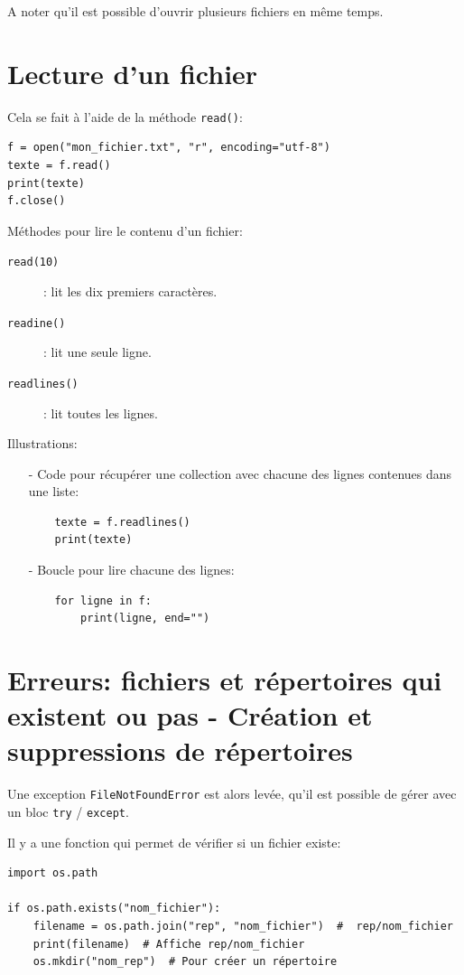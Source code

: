 \documentclass[a4paper,12pt]{book}
\begin{document}
A noter qu'il est possible d'ouvrir plusieurs fichiers en même temps.
\medskip

\section{Lecture d'un fichier}
Cela se fait à l'aide de la méthode \texttt{read()}:
\begin{lstlisting}
f = open("mon_fichier.txt", "r", encoding="utf-8")
texte = f.read()
print(texte)
f.close()
\end{lstlisting}
\medskip

Méthodes pour lire le contenu d'un fichier:
\begin{description}
    \item[\texttt{read(10)}]: lit les dix premiers caractères.
    \item[\texttt{readine()}]: lit une seule ligne.
    \item[\texttt{readlines()}]: lit toutes les lignes.
\end{description}
\medskip

Illustrations:
\begin{itemize}
	\item[-] Code pour récupérer une collection avec chacune des lignes contenues dans une liste:
	\begin{lstlisting}
	texte = f.readlines()
	print(texte)
	\end{lstlisting}
	\item[-] Boucle pour lire chacune des lignes:
	\begin{lstlisting}
	for ligne in f:
	    print(ligne, end="")
	\end{lstlisting}
\end{itemize}
\medskip

\section{Erreurs: fichiers et répertoires qui existent ou pas - Création et suppressions de répertoires}
Une exception \texttt{FileNotFoundError} est alors levée, qu'il est possible de gérer avec un bloc \texttt{try} / \texttt{except}.
\medskip

Il y a une fonction qui permet de vérifier si un fichier existe:
\begin{lstlisting}
import os.path

if os.path.exists("nom_fichier"):
	filename = os.path.join("rep", "nom_fichier")  #  rep/nom_fichier
	print(filename)  # Affiche rep/nom_fichier
	os.mkdir("nom_rep")  # Pour créer un répertoire
\end{lstlisting}
\medskip
\end{document}

